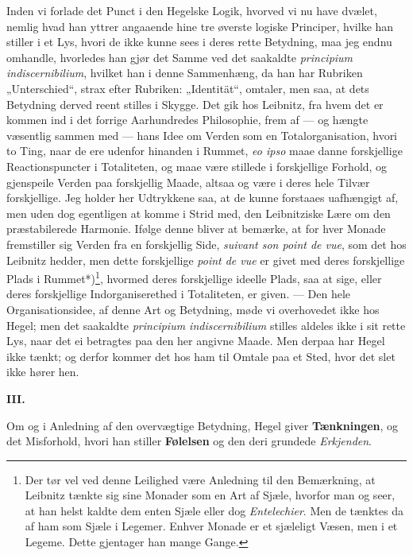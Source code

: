 \documentclass[12pt,a4paper]{book}
\newcommand{\apage}[1]{\marginnote{\footnotesize\textit{[#1]}}}
\begin{document}
Inden vi forlade det Punct i den Hegelske Logik, hvorved vi nu have dvælet,
nemlig hvad han yttrer angaaende hine tre øverste logiske Principer, hvilke
han stiller i et Lys, hvori de ikke kunne sees i deres rette Betydning, maa
jeg endnu omhandle, hvorledes han gjør det Samme ved det saakaldte
\textit{principium indiscernibilium}, hvilket han i denne Sammenhæng, da
han har Rubriken „Unterschied“, strax efter Rubriken: „Identität“, omtaler,
men saa, at dets Betydning derved reent stilles i Skygge. Det gik hos
Leibnitz, fra hvem det er kommen ind i det forrige \apage{92} Aarhundredes
Philosophie, frem af --- og hængte væsentlig sammen med --- hans Idee om
Verden som en Totalorganisation, hvori to Ting, naar de ere udenfor
hinanden i Rummet, \textit{eo ipso} maae danne forskjellige
Reactionspuncter i Totaliteten, og maae være stillede i forskjellige
Forhold, og gjenspeile Verden paa forskjellig Maade, altsaa og være i deres
hele Tilvær forskjellige. Jeg holder her Udtrykkene saa, at de kunne
forstaaes uafhængigt af, men uden dog egentligen at komme i Strid med, den
Leibnitziske Lære om den præstabilerede Harmonie. Ifølge denne bliver at
bemærke, at for hver Monade fremstiller sig Verden fra en forskjellig Side,
\textit{suivant son point de vue}, som det hos Leibnitz hedder, men dette
forskjellige \textit{point de vue} er givet med deres forskjellige Plads i
Rummet*)\footnote{Der tør vel ved denne Leilighed være Anledning til den
Bemærkning, at Leibnitz tænkte sig sine Monader som en Art af Sjæle,
hvorfor man og seer, at han helst kaldte dem enten Sjæle eller dog
\emph{Entelechier}. Men de tænktes da af ham som Sjæle i Legemer. Enhver Monade er
et sjæleligt Væsen, men i et Legeme. Dette gjentager han mange Gange.},
hvormed deres forskjellige ideelle Plads, saa at sige, eller deres
forskjellige Indorganiserethed i Totaliteten, er given. --- Den hele
Organisationsidee, af denne Art og Betydning, møde vi overhovedet ikke hos
Hegel; men det saakaldte \textit{principium indiscernibilium} stilles
aldeles ikke i sit rette Lys, naar det ei betragtes paa den her angivne
Maade. Men derpaa har Hegel ikke tænkt; og derfor kommer det hos ham til
Omtale paa et Sted, hvor det slet ikke hører hen.

%
\bigskip
\begin{center}
\apage{93} {\large\textbf{III.}}

\medskip
Om og i Anledning af den overvægtige Betydning, Hegel giver
\textbf{Tænkningen}, og det Misforhold, hvori han stiller \textbf{Følelsen} og
den deri grundede \emph{Erkjenden}.
\end{center}
\bigskip
\end{document}
